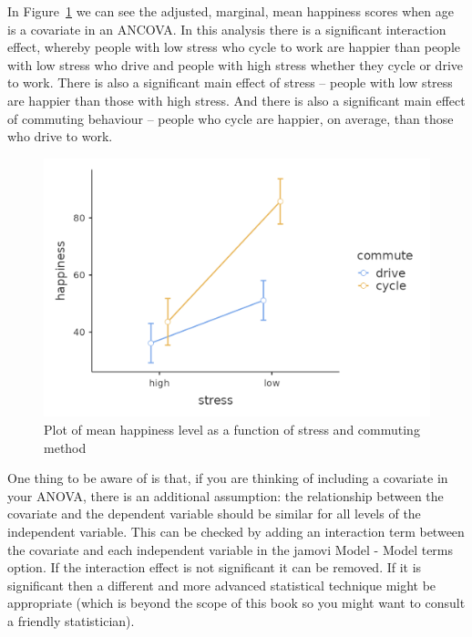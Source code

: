 \documentclass[
  a4paper,
]{book}
\begin{document}
In Figure~\ref{fig-fig14-15} we can see the adjusted, marginal, mean
happiness scores when age is a covariate in an ANCOVA. In this analysis
there is a significant interaction effect, whereby people with low
stress who cycle to work are happier than people with low stress who
drive and people with high stress whether they cycle or drive to work.
There is also a significant main effect of stress -- people with low
stress are happier than those with high stress. And there is also a
significant main effect of commuting behaviour -- people who cycle are
happier, on average, than those who drive to work.

\begin{figure}

\includegraphics[width=1\textwidth,height=\textheight]{images/fig14-15.png} \hfill{}

\caption{\label{fig-fig14-15}Plot of mean happiness level as a function
of stress and commuting method}

\end{figure}

One thing to be aware of is that, if you are thinking of including a
covariate in your ANOVA, there is an additional assumption: the
relationship between the covariate and the dependent variable should be
similar for all levels of the independent variable. This can be checked
by adding an interaction term between the covariate and each independent
variable in the jamovi Model - Model terms option. If the interaction
effect is not significant it can be removed. If it is significant then a
different and more advanced statistical technique might be appropriate
(which is beyond the scope of this book so you might want to consult a
friendly statistician).
\end{document}
